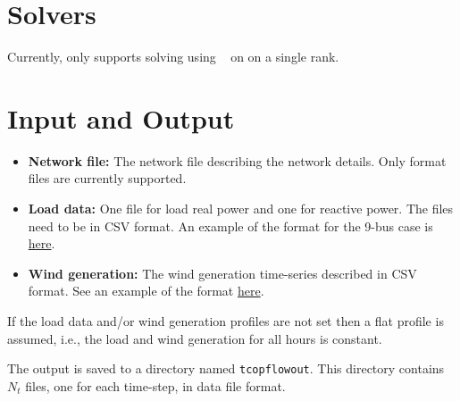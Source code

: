 \section{Solvers}\label{sec:tcopflow_solvers}%
Currently, \exago only supports solving \tcopflow using \ipopt~ on on a single rank. %

\section{Input and Output}
\begin{itemize}
    \item \textbf{Network file:} The network file describing the network details. Only \matpower format files are currently supported.
    \item \textbf{Load data:} One file for load real power and one for reactive power. The files need to be in CSV format. An example of the format for the 9-bus case is \href{https://github.com/ORNL/ExaGO/tree/develop/datafiles/case9}{here}.
    \item \textbf{Wind generation:} The wind generation time-series described in CSV format. See an example of the format \href{https://github.com/ORNL/ExaGO/tree/develop/datafiles/case9}{here}.
\end{itemize}
If the load data and/or wind generation profiles are not set then a flat profile is assumed, i.e., the load and wind generation for all hours is constant.

The \tcopflow output is saved to a directory named \texttt{tcopflowout}. This directory contains $N_t$ files, one for each time-step, in \matpower data file format.

